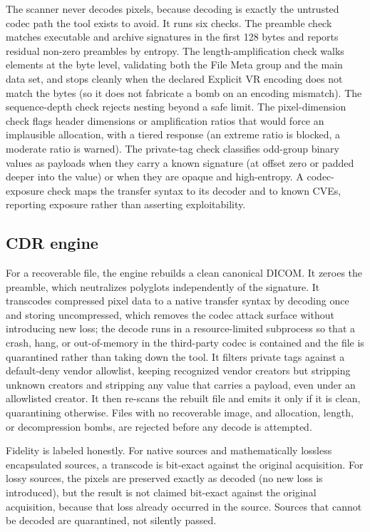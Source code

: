\documentclass[11pt]{article}
\begin{document}
The scanner never decodes pixels, because decoding is exactly the untrusted codec path the tool exists to avoid. It runs six checks. The preamble check matches executable and archive signatures in the first 128 bytes and reports residual non-zero preambles by entropy. The length-amplification check walks elements at the byte level, validating both the File Meta group and the main data set, and stops cleanly when the declared Explicit VR encoding does not match the bytes (so it does not fabricate a bomb on an encoding mismatch). The sequence-depth check rejects nesting beyond a safe limit. The pixel-dimension check flags header dimensions or amplification ratios that would force an implausible allocation, with a tiered response (an extreme ratio is blocked, a moderate ratio is warned). The private-tag check classifies odd-group binary values as payloads when they carry a known signature (at offset zero or padded deeper into the value) or when they are opaque and high-entropy. A codec-exposure check maps the transfer syntax to its decoder and to known CVEs, reporting exposure rather than asserting exploitability.

\subsection{CDR engine}

For a recoverable file, the engine rebuilds a clean canonical DICOM. It zeroes the preamble, which neutralizes polyglots independently of the signature. It transcodes compressed pixel data to a native transfer syntax by decoding once and storing uncompressed, which removes the codec attack surface without introducing new loss; the decode runs in a resource-limited subprocess so that a crash, hang, or out-of-memory in the third-party codec is contained and the file is quarantined rather than taking down the tool. It filters private tags against a default-deny vendor allowlist, keeping recognized vendor creators but stripping unknown creators and stripping any value that carries a payload, even under an allowlisted creator. It then re-scans the rebuilt file and emits it only if it is clean, quarantining otherwise. Files with no recoverable image, and allocation, length, or decompression bombs, are rejected before any decode is attempted.

Fidelity is labeled honestly. For native sources and mathematically lossless encapsulated sources, a transcode is bit-exact against the original acquisition. For lossy sources, the pixels are preserved exactly as decoded (no new loss is introduced), but the result is not claimed bit-exact against the original acquisition, because that loss already occurred in the source. Sources that cannot be decoded are quarantined, not silently passed.
\end{document}
